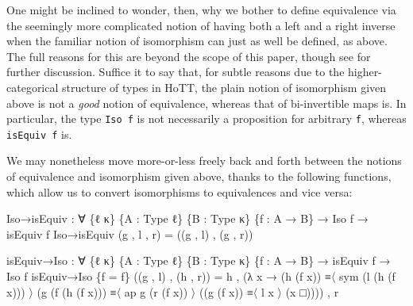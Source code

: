 \documentclass[
  11pt,
  oneside,
  article]{memoir}
\newenvironment{Shaded}{}{}
\newcommand{\NormalTok}[1]{#1}
\newcommand{\OtherTok}[1]{\textcolor[rgb]{0.00,0.44,0.13}{#1}}
\theoremstyle{definition}
\theoremstyle{plain}
\newcommand{\0}{\textsf{0}}
\newcommand{\1}{\tn{\textsf{1}}}
\begin{document}
One might be inclined to wonder, then, why we bother to define
equivalence via the seemingly more complicated notion of having both a
left and a right inverse when the familiar notion of isomorphism can
just as well be defined, as above. The full reasons for this are beyond
the scope of this paper, though see \cite{hottbook} for further
discussion. Suffice it to say that, for subtle reasons due to the
higher-categorical structure of types in HoTT, the plain notion of
isomorphism given above is not a \emph{good} notion of equivalence,
whereas that of bi-invertible maps is. In particular, the type
\texttt{Iso\ f} is not necessarily a proposition for arbitrary
\texttt{f}, whereas \texttt{isEquiv\ f} is.

We may nonetheless move more-or-less freely back and forth between the
notions of equivalence and isomorphism given above, thanks to the
following functions, which allow us to convert isomorphisms to
equivalences and vice versa:

\begin{Shaded}
\begin{Highlighting}[]
\NormalTok{Iso→isEquiv }\OtherTok{:} \OtherTok{∀} \OtherTok{\{}\NormalTok{ℓ κ}\OtherTok{\}} \OtherTok{\{}\NormalTok{A }\OtherTok{:}\NormalTok{ Type ℓ}\OtherTok{\}} \OtherTok{\{}\NormalTok{B }\OtherTok{:}\NormalTok{ Type κ}\OtherTok{\}} \OtherTok{\{}\NormalTok{f }\OtherTok{:}\NormalTok{ A }\OtherTok{→}\NormalTok{ B}\OtherTok{\}} 
              \OtherTok{→}\NormalTok{ Iso f }\OtherTok{→}\NormalTok{ isEquiv f}
\NormalTok{Iso→isEquiv }\OtherTok{(}\NormalTok{g , l , r}\OtherTok{)} \OtherTok{=} \OtherTok{((}\NormalTok{g , l}\OtherTok{)}\NormalTok{ , }\OtherTok{(}\NormalTok{g , r}\OtherTok{))}

\NormalTok{isEquiv→Iso }\OtherTok{:} \OtherTok{∀} \OtherTok{\{}\NormalTok{ℓ κ}\OtherTok{\}} \OtherTok{\{}\NormalTok{A }\OtherTok{:}\NormalTok{ Type ℓ}\OtherTok{\}} \OtherTok{\{}\NormalTok{B }\OtherTok{:}\NormalTok{ Type κ}\OtherTok{\}} \OtherTok{\{}\NormalTok{f }\OtherTok{:}\NormalTok{ A }\OtherTok{→}\NormalTok{ B}\OtherTok{\}} 
              \OtherTok{→}\NormalTok{ isEquiv f }\OtherTok{→}\NormalTok{ Iso f}
\NormalTok{isEquiv→Iso }\OtherTok{\{}\NormalTok{f }\OtherTok{=}\NormalTok{ f}\OtherTok{\}} \OtherTok{((}\NormalTok{g , l}\OtherTok{)}\NormalTok{ , }\OtherTok{(}\NormalTok{h , r}\OtherTok{))} \OtherTok{=} 
\NormalTok{    h , }\OtherTok{(λ}\NormalTok{ x }\OtherTok{→} \OtherTok{(}\NormalTok{h }\OtherTok{(}\NormalTok{f x}\OtherTok{))}\NormalTok{        ≡〈 sym }\OtherTok{(}\NormalTok{l }\OtherTok{(}\NormalTok{h }\OtherTok{(}\NormalTok{f x}\OtherTok{)))}\NormalTok{ 〉 }
               \OtherTok{(}\NormalTok{g }\OtherTok{(}\NormalTok{f }\OtherTok{(}\NormalTok{h }\OtherTok{(}\NormalTok{f x}\OtherTok{)))}\NormalTok{ ≡〈 ap g }\OtherTok{(}\NormalTok{r }\OtherTok{(}\NormalTok{f x}\OtherTok{))}\NormalTok{ 〉}
               \OtherTok{((}\NormalTok{g }\OtherTok{(}\NormalTok{f x}\OtherTok{))}\NormalTok{       ≡〈 l x 〉 }
               \OtherTok{(}\NormalTok{x □}\OtherTok{))))}\NormalTok{ , r}
\end{Highlighting}
\end{Shaded}
\end{document}

